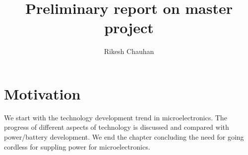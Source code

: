 \documentclass[12pt,a4paper,UKenglish]{article}
\title{Preliminary report on master project}
\author{Rikesh Chauhan}
\date{}
\begin{document}
\maketitle

% 
% 

\section{Motivation}

We start with the technology development trend in microelectronics. The progress of different aspects of 
technology is discussed and compared with power/battery development. We end the chapter concluding the need for
going cordless for suppling power for microelectronics.
\end{document}
